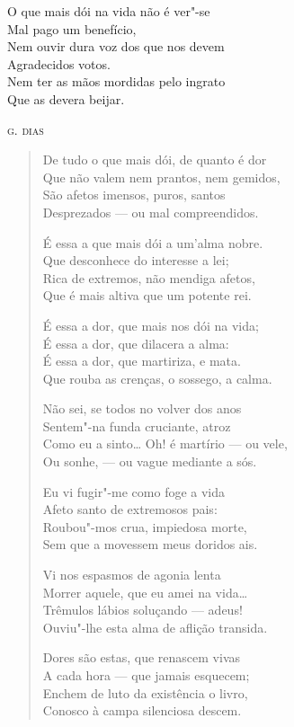 \epigraph{O que mais dói na vida não é ver"-se\\
Mal pago um benefício,\\
Nem ouvir dura voz dos que nos devem\\
Agradecidos votos.\\
Nem ter as mãos mordidas pelo ingrato\\
Que as devera beijar.}{\textsc{g. dias}}

\begin{verse}
De tudo o que mais dói, de quanto é dor\\
Que não valem nem prantos, nem gemidos,\\
São afetos imensos, puros, santos\\
Desprezados --- ou mal compreendidos.

É essa a que mais dói a um'alma nobre.\\
Que desconhece do interesse a lei;\\
Rica de extremos, não mendiga afetos,\\
Que é mais altiva que um potente rei.

É essa a dor, que mais nos dói na vida;\\
É essa a dor, que dilacera a alma:\\
É essa a dor, que martiriza, e mata.\\
Que rouba as crenças, o sossego, a calma.

Não sei, se todos no volver dos anos\\
Sentem"-na funda cruciante, atroz\\
Como eu a sinto\ldots{} Oh! é martírio --- ou vele,\\
Ou sonhe, --- ou vague mediante a sós.

Eu vi fugir"-me como foge a vida\\
Afeto santo de extremosos pais:\\
Roubou"-mos crua, impiedosa morte,\\
Sem que a movessem meus doridos ais.

Vi nos espasmos de agonia lenta\\
Morrer aquele, que eu amei na vida\ldots{}\\
Trêmulos lábios soluçando --- adeus!\\
Ouviu"-lhe esta alma de aflição transida.

Dores são estas, que renascem vivas\\
A cada hora --- que jamais esquecem;\\
Enchem de luto da existência o livro,\\
Conosco à campa silenciosa descem.


\end{verse}
